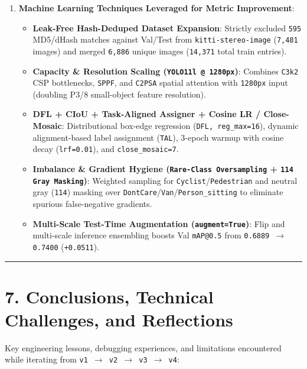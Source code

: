 \documentclass[10.5pt,a4paper]{article}
\begin{document}
\begin{enumerate}[leftmargin=1.8em,itemsep=2pt]
\item \textbf{Machine Learning Techniques Leveraged for Metric Improvement}:
\begin{itemize}[leftmargin=1.5em,itemsep=2pt]
\item \textbf{Leak-Free Hash-Deduped Dataset Expansion}: Strictly excluded \texttt{595} MD5/dHash matches against Val/Test from \texttt{kitti-\allowbreak{}stereo-\allowbreak{}image} (\texttt{7,\allowbreak{}481} images) and merged \texttt{6,\allowbreak{}886} unique images (\texttt{14,\allowbreak{}371} total train entries).
\item \textbf{Capacity \& Resolution Scaling (\texttt{YOLO11l @ 1280px})}: Combines \texttt{C3k2} CSP bottlenecks, \texttt{SPPF}, and \texttt{C2PSA} spatial attention with \texttt{1280px} input (doubling P3/8 small-object feature resolution).
\item \textbf{DFL + CIoU + Task-Aligned Assigner + Cosine LR / Close-Mosaic}: Distributional box-edge regression (\texttt{DFL,\allowbreak{} reg\_\allowbreak{}max=16}), dynamic alignment-based label assignment (\texttt{TAL}), 3-epoch warmup with cosine decay (\texttt{lrf=0.\allowbreak{}01}), and \texttt{close\_\allowbreak{}mosaic=7}.
\item \textbf{Imbalance \& Gradient Hygiene (\texttt{Rare-\allowbreak{}Class Oversampling} + \texttt{114 Gray Masking})}: Weighted sampling for \texttt{Cyclist}/\texttt{Pedestrian} and neutral gray (\texttt{114}) masking over \texttt{DontCare}/\texttt{Van}/\texttt{Person\_\allowbreak{}sitting} to eliminate spurious false-negative gradients.
\item \textbf{Multi-Scale Test-Time Augmentation (\texttt{augment=True})}: Flip and multi-scale inference ensembling boosts Val \texttt{mAP@0.\allowbreak{}5} from \texttt{0.\allowbreak{}6889 $\rightarrow$ 0.\allowbreak{}7400} (\texttt{+0.\allowbreak{}0511}).
\end{itemize}
\end{enumerate}

\par\noindent\rule{\textwidth}{0.4pt}\par\medskip

\section{7. Conclusions, Technical Challenges, and Reflections}

Key engineering lessons, debugging experiences, and limitations encountered while iterating from \texttt{v1 $\rightarrow$ v2 $\rightarrow$ v3 $\rightarrow$ v4}:
\end{document}
